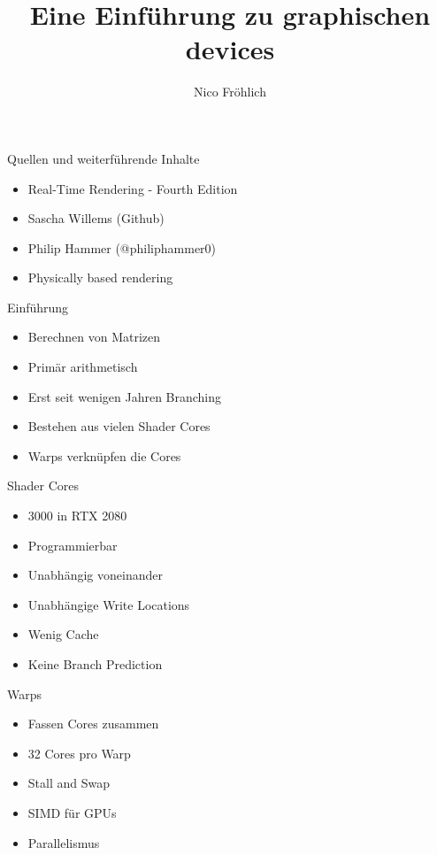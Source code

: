 \documentclass[11pt]{beamer}
\author{Nico Fröhlich}
\title{Eine Einführung zu graphischen devices}
\institute{Troblecodings}
\begin{document}
\begin{frame}
    \titlepage
\end{frame}

\begin{frame}{Quellen und weiterführende Inhalte}
    \begin{itemize}
        \item Real-Time Rendering - Fourth Edition
        \item Sascha Willems (Github)
        \item Philip Hammer (@philiphammer0)
        \item Physically based rendering
    \end{itemize}
\end{frame}

\begin{frame}{Einführung}
    \begin{itemize}
        \item Berechnen von Matrizen
        \item Primär arithmetisch
        \item Erst seit wenigen Jahren Branching
        \item Bestehen aus vielen Shader Cores
        \item Warps verknüpfen die Cores
    \end{itemize}
\end{frame}

\begin{frame}{Shader Cores}
    \begin{itemize}
        \item 3000 in RTX 2080
        \item Programmierbar
        \item Unabhängig voneinander
        \item Unabhängige Write Locations
        \item Wenig Cache
        \item Keine Branch Prediction
    \end{itemize}
\end{frame}

\begin{frame}{Warps}
    \begin{itemize}
        \item Fassen Cores zusammen
        \item 32 Cores pro Warp
        \item Stall and Swap
        \item SIMD für GPUs
        \item Parallelismus
    \end{itemize}
\end{frame}
\end{document}
